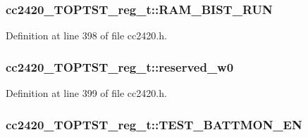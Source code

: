 \subsubsection[{\texorpdfstring{R\+A\+M\+\_\+\+B\+I\+S\+T\+\_\+\+R\+UN}{RAM_BIST_RUN}}]{ cc2420\+\_\+\+T\+O\+P\+T\+S\+T\+\_\+reg\+\_\+t\+::\+R\+A\+M\+\_\+\+B\+I\+S\+T\+\_\+\+R\+UN}\hypertarget{structcc2420___t_o_p_t_s_t__reg__t_a93da8870a250cdcbc8293d9375742553}{}\label{structcc2420___t_o_p_t_s_t__reg__t_a93da8870a250cdcbc8293d9375742553}


Definition at line 398 of file cc2420.\+h.

\subsubsection[{\texorpdfstring{reserved\+\_\+w0}{reserved_w0}}]{ cc2420\+\_\+\+T\+O\+P\+T\+S\+T\+\_\+reg\+\_\+t\+::reserved\+\_\+w0}\hypertarget{structcc2420___t_o_p_t_s_t__reg__t_a08a4077c02c86c8f3a8c3dfba534b804}{}\label{structcc2420___t_o_p_t_s_t__reg__t_a08a4077c02c86c8f3a8c3dfba534b804}


Definition at line 399 of file cc2420.\+h.

\subsubsection[{\texorpdfstring{T\+E\+S\+T\+\_\+\+B\+A\+T\+T\+M\+O\+N\+\_\+\+EN}{TEST_BATTMON_EN}}]{ cc2420\+\_\+\+T\+O\+P\+T\+S\+T\+\_\+reg\+\_\+t\+::\+T\+E\+S\+T\+\_\+\+B\+A\+T\+T\+M\+O\+N\+\_\+\+EN}\hypertarget{structcc2420___t_o_p_t_s_t__reg__t_a4ac8e1eee922278b580146ca53e5a729}{}\label{structcc2420___t_o_p_t_s_t__reg__t_a4ac8e1eee922278b580146ca53e5a729}


